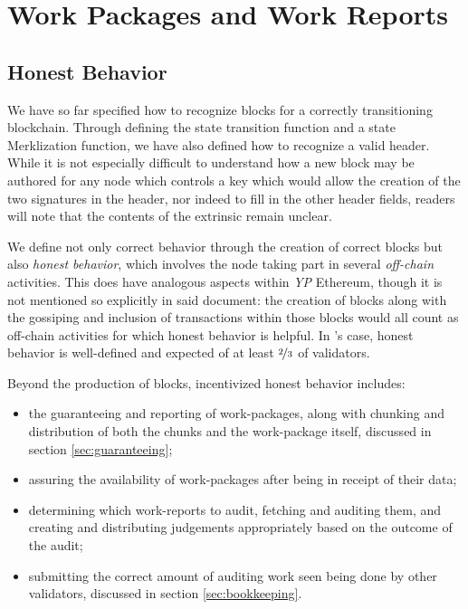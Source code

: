 \section{Work Packages and Work Reports}\label{sec:workpackagesandworkreports}

\subsection{Honest Behavior}

We have so far specified how to recognize blocks for a correctly transitioning \Jam blockchain. Through defining the state transition function and a state Merklization function, we have also defined how to recognize a valid header. While it is not especially difficult to understand how a new block may be authored for any node which controls a key which would allow the creation of the two signatures in the header, nor indeed to fill in the other header fields, readers will note that the contents of the extrinsic remain unclear.

We define not only correct behavior through the creation of correct blocks but also \emph{honest behavior}, which involves the node taking part in several \emph{off-chain} activities. This does have analogous aspects within \emph{YP} Ethereum, though it is not mentioned so explicitly in said document: the creation of blocks along with the gossiping and inclusion of transactions within those blocks would all count as off-chain activities for which honest behavior is helpful. In \Jam's case, honest behavior is well-defined and expected of at least $\nicefrac{2}{3}$ of validators.

Beyond the production of blocks, incentivized honest behavior includes:
\begin{itemize}
    \item the guaranteeing and reporting of work-packages, along with chunking and distribution of both the chunks and the work-package itself, discussed in section \ref{sec:guaranteeing};
    \item assuring the availability of work-packages after being in receipt of their data;
    \item determining which work-reports to audit, fetching and auditing them, and creating and distributing judgements appropriately based on the outcome of the audit;
    \item submitting the correct amount of auditing work seen being done by other validators, discussed in section \ref{sec:bookkeeping}.
\end{itemize}

